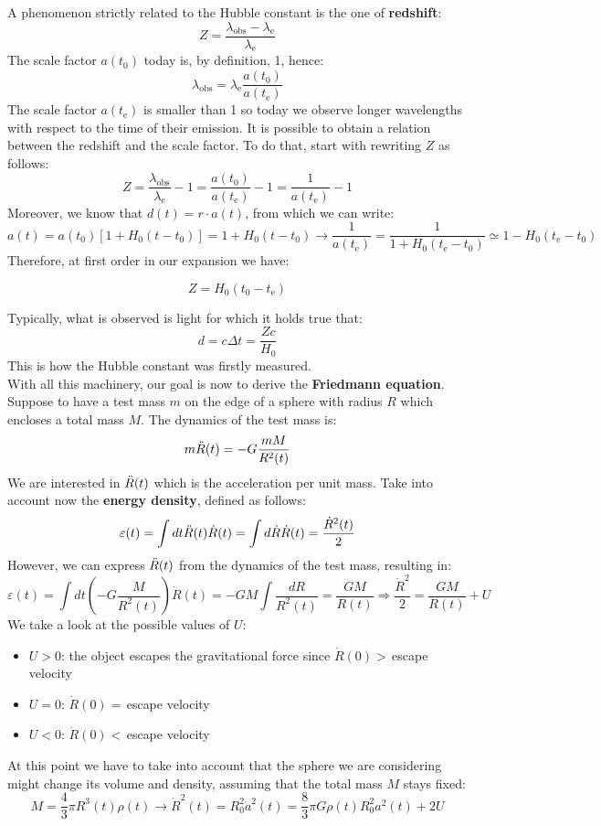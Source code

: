 \documentclass[10.75pt,a4paper,openright,bottom=2cm]{article}
\newcommand{\beginbox}[1]{\begin{tcolorbox}[width=\textwidth,colback={black!40},title={#1},colbacktitle={purple!55},coltitle=black]}
\renewcommand{\endbox}{\end{tcolorbox}\noindent}
\begin{document}
A phenomenon strictly related to the Hubble constant is the one of \textbf{redshift}:
\[
Z=\frac{\lambda_{\text{obs}}-\lambda_{\text{e}}}{\lambda_{\text{e}}}
\]
The scale factor $a(t_0)$ today is, by definition, 1, hence:
\[
\lambda_{\text{obs}}=\lambda_{\text{e}}\frac{a(t_0)}{a(t_{\text{e}})}
\]
The scale factor $a(t_{\text{e}})$ is smaller than 1 so today we observe longer wavelengths with respect to the time of their emission. It is possible to obtain a relation between the redshift and the scale factor. To do that, start with rewriting $Z$ as follows:
\[
Z=\frac{\lambda_{\text{obs}}}{\lambda_{\text{e}}}-1=\frac{a(t_0)}{a(t_{\text{e}})}-1=\frac{1}{a(t_{\text{e}})}-1
\]
Moreover, we know that $d(t)=r\cdot a(t)$, from which we can write:
\[
a(t)=a(t_0)[1+H_0(t-t_0)]=1+H_0(t-t_0)\to\frac{1}{a(t_{\text{e}})}=\frac{1}{1+H_0(t_{\text{e}}-t_0)}\simeq1-H_0(t_{\text{e}}-t_0)
\]
Therefore, at first order in our expansion we have:
\beginbox{Redshift}
\[
Z=H_0(t_0-t_{\text{e}})
\]
\endbox
Typically, what is observed is light for which it holds true that:
\[
d=c\Delta t=\frac{Zc}{H_0}
\]
This is how the Hubble constant was firstly measured.\\
With all this machinery, our goal is now to derive the \textbf{Friedmann equation}. Suppose to have a test mass $m$ on the edge of a sphere with radius $R$ which encloses a total mass $M$. The dynamics of the test mass is:
\[
m\Ddot{R}(t)=-G\frac{mM}{R^2(t)}
\]
We are interested in $\Ddot{R}(t)$ which is the acceleration per unit mass. Take into account now the \textbf{energy density}, defined as follows:
\[
\varepsilon(t)=\int dt\Ddot{R}(t)\Dot{R}(t)=\int d\Dot{R}\Dot{R}(t)=\frac{\Dot{R}^2(t)}{2}
\]
However, we can express $\Ddot{R}(t)$ from the dynamics of the test mass, resulting in:
\[
\varepsilon(t)=\int dt\left(-G\frac{M}{R^2(t)}\right)\Dot{R}(t)=-GM\int \frac{dR}{R^2(t)}=\frac{GM}{R(t)}\Rightarrow\frac{\Dot{R}^2}{2}=\frac{GM}{R(t)}+U
\]
We take a look at the possible values of $U$:
\begin{itemize}
    \item $U>0$: the object escapes the gravitational force since $\Dot{R}(0)>$\,escape velocity
    \item $U=0$: $\Dot{R}(0)=$\,escape velocity
    \item $U<0$: $\Dot{R}(0)<$\,escape velocity
\end{itemize}
At this point we have to take into account that the sphere we are considering might change its volume and density, assuming that the total mass $M$ stays fixed:
\[
M=\frac{4}{3}\pi R^3(t)\rho(t)\to\Dot{R}^2(t)=R_0^2\Dot{a}^2(t)=\frac{8}{3}\pi G\rho(t)R_0^2a^2(t)+2U
\]
\end{document}
